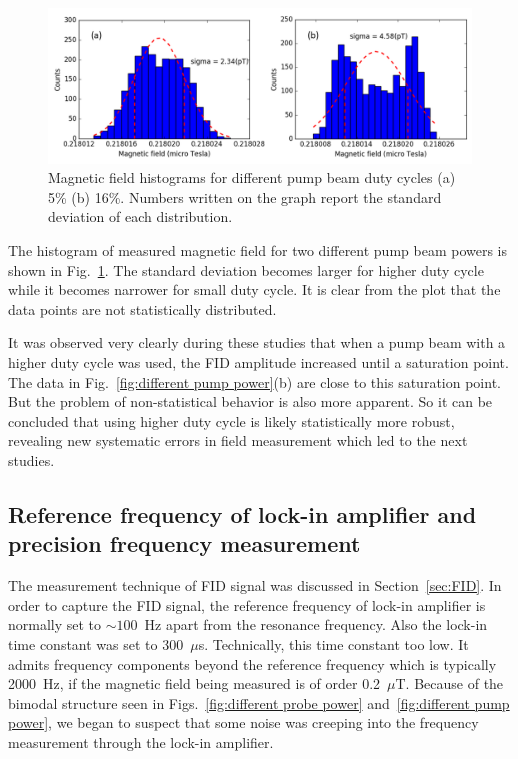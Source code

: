 \begin{figure}
  \centering
  \includegraphics[width=\textwidth]{figures/pump_beam}
  \caption{Magnetic field histograms for different pump beam duty
    cycles (a) 5\% (b) 16\%.  Numbers written on the graph report the
    standard deviation of each distribution.}
    \label{fig:different pump power}
\end{figure}

The histogram of measured magnetic field for two different pump beam
powers is shown in Fig.~\ref{fig:different pump power}. The standard
deviation becomes larger for higher duty cycle while it becomes
narrower for small duty cycle.  It is clear from the plot that the
data points are not statistically distributed.  

It was observed very clearly during these studies that when a pump
beam with a higher duty cycle was used, the FID amplitude increased
until a saturation point.  The data in Fig.~\ref{fig:different pump
  power}(b) are close to this saturation point.  But the problem of
non-statistical behavior is also more apparent.  So it can be
concluded that using higher duty cycle is likely statistically more
robust, revealing new systematic errors in field measurement which led
to the next studies.

\subsection{Reference frequency of lock-in amplifier and precision frequency measurement}

The measurement technique of FID signal was discussed in
Section~\ref{sec:FID}.  In order to capture the FID signal, the
reference frequency of lock-in amplifier is normally set to $\sim
100$~Hz apart from the resonance frequency.  Also the lock-in time
constant was set to 300~$\mu$s.  Technically, this time constant too
low.  It admits frequency components beyond the reference frequency
which is typically 2000~Hz, if the magnetic field being measured is of
order 0.2~$\mu$T.  Because of the bimodal structure seen in
Figs.~\ref{fig:different probe power} and~\ref{fig:different pump
  power}, we began to suspect that some noise was creeping into the
frequency measurement through the lock-in amplifier.

